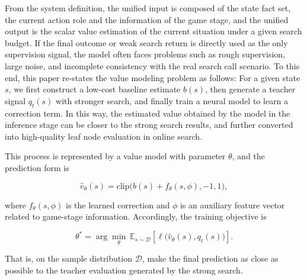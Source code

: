 From the system definition, the unified input is composed of the state fact set, the current action role and the information of the game stage, and the unified output is the scalar value estimation of the current situation under a given search budget. If the final outcome or weak search return is directly used as the only supervision signal, the model often faces problems such as rough supervision, large noise, and incomplete consistency with the real search call scenario. To this end, this paper re-states the value modeling problem as follows:
For a given state $s$, we first construct a low-cost baseline estimate $b(s)$, then generate a teacher signal $q_t(s)$ with stronger search, and finally train a neural model to learn a correction term. In this way, the estimated value obtained by the model in the inference stage can be closer to the strong search results, and further converted into high-quality leaf node evaluation in online search.

This process is represented by a value model with parameter $\theta$, and 
the prediction form is

\begin{equation}
\hat{v}_{\theta}(s)=\mathrm{clip}\bigl(b(s)+f_{\theta}(s,\phi),-1,1\bigr),
\end{equation}


where $f_{\theta}(s,\phi)$ is the learned correction and $\phi$ is an auxiliary feature vector related to game-stage information. Accordingly, the training objective is


\begin{equation}
\theta^\ast=\arg\min_{\theta}\ \mathbb{E}_{s\sim \mathcal{D}}\left[\ell\bigl(\hat{v}_{\theta}(s),q_t(s)\bigr)\right].
\end{equation}

That is, on the sample distribution $\mathcal{D}$, make the final prediction as close as possible to the teacher evaluation generated by the strong search.



